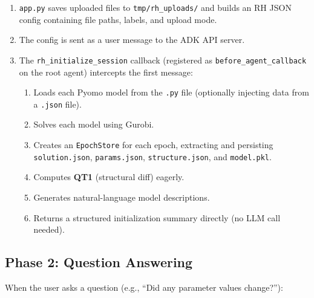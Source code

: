 \documentclass[11pt, a4paper]{article}
\begin{document}
\begin{enumerate}[leftmargin=2em]
    \item \textcolor{shared}{\texttt{app.py}} saves uploaded files to
          \texttt{tmp/rh\_uploads/} and builds an RH JSON config containing
          file paths, labels, and upload mode.
    \item The config is sent as a user message to the
          \textcolor{shared}{ADK API server}.
    \item The \textcolor{newcode}{\texttt{rh\_initialize\_session}} callback
          (registered as \texttt{before\_agent\_callback} on the root agent)
          intercepts the first message:
    \begin{enumerate}
        \item Loads each Pyomo model from the \texttt{.py} file
              (optionally injecting data from a \texttt{.json} file).
        \item Solves each model using Gurobi.
        \item Creates an \textcolor{newcode}{\texttt{EpochStore}} for each
              epoch, extracting and persisting
              \texttt{solution.json}, \texttt{params.json},
              \texttt{structure.json}, and \texttt{model.pkl}.
        \item Computes \textbf{QT1} (structural diff) eagerly.
        \item Generates natural-language model descriptions.
        \item Returns a structured initialization summary directly
              (no LLM call needed).
    \end{enumerate}
\end{enumerate}

\subsection{Phase 2: Question Answering}

When the user asks a question (e.g., ``Did any parameter values change?''):
\end{document}
